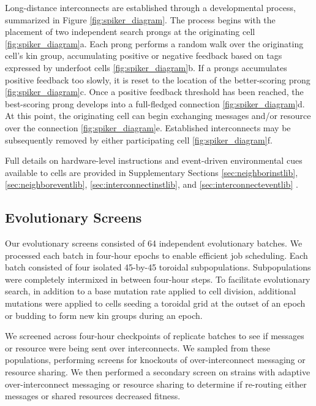 Long-distance interconnects are established through a developmental process, summarized in Figure \ref{fig:spiker_diagram}.
The process begins with the placement of two independent search prongs at the originating cell \ref{fig:spiker_diagram}a.
Each prong performs a random walk over the originating cell's kin group, accumulating positive or negative feedback based on tags expressed by underfoot cells \ref{fig:spiker_diagram}b.
If a prongs accumulates positive feedback too slowly, it is reset to the location of the better-scoring prong \ref{fig:spiker_diagram}c.
Once a positive feedback threshold has been reached, the best-scoring prong develops into a full-fledged connection \ref{fig:spiker_diagram}d.
At this point, the originating cell can begin exchanging messages and/or resource over the connection \ref{fig:spiker_diagram}e.
Established interconnects may be subsequently removed by either participating cell \ref{fig:spiker_diagram}f.

Full details on hardware-level instructions and event-driven environmental cues available to cells are provided in Supplementary Sections \ref{sec:neighborinstlib}, \ref{sec:neighboreventlib}, \ref{sec:interconnectinstlib}, and \ref{sec:interconnecteventlib} \cite{Moreno_Ofria_2020}.





\subsection{Evolutionary Screens}

Our evolutionary screens consisted of 64 independent evolutionary batches.
We processed each batch in four-hour epochs to enable efficient job scheduling.
Each batch consisted of four isolated 45-by-45 toroidal subpopulations.
Subpopulations were completely intermixed in between four-hour steps.
To facilitate evolutionary search, in addition to a base mutation rate applied to cell division, additional mutations were applied to cells seeding a toroidal grid at the outset of an epoch or budding to form new kin groups during an epoch.

We screened across four-hour checkpoints of replicate batches to see if messages or resource were being sent over interconnects.
We sampled from these populations, performing screens for knockouts of over-interconnect messaging or resource sharing.
We then performed a secondary screen on strains with adaptive over-interconnect messaging or resource sharing to determine if re-routing either messages or shared resources decreased fitness.

